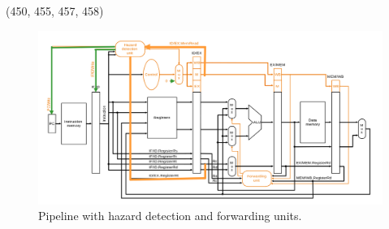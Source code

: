 \begin{theorem}{(450, 455, 457, 458)}
\begin{itemize}
\begin{figure}[H]
            \centering
            \includegraphics[scale=0.3]{img/pipeline-hazard.png}
            \caption{Pipeline with hazard detection and forwarding units.}
            \label{img:pipeline-hazard}
        \end{figure}
    \end{itemize}
\end{theorem}

